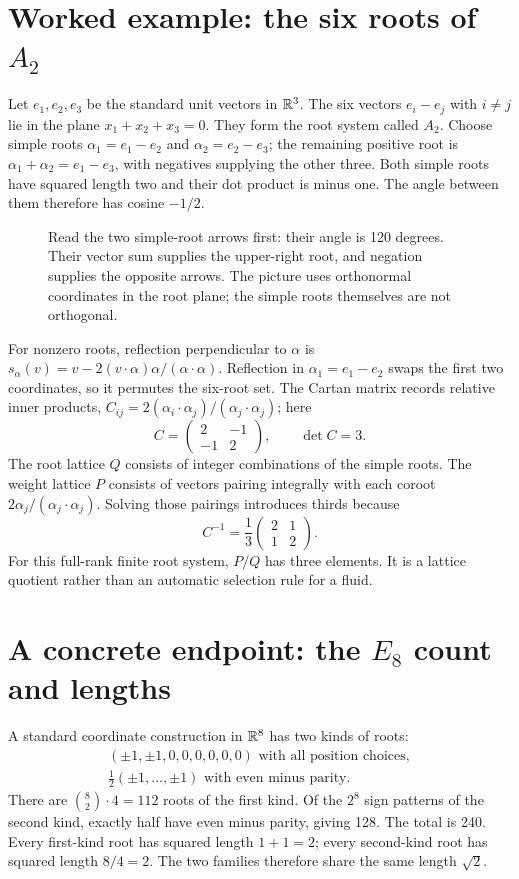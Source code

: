 \section{Worked example: the six roots of \texorpdfstring{$A_2$}{A2}}
Let $e_1,e_2,e_3$ be the standard unit vectors in $\mathbb{R}^3$. The six vectors
$e_i-e_j$ with $i\ne j$ lie in the plane $x_1+x_2+x_3=0$.
They form the root system called $A_2$. Choose simple roots
$\alpha_1=e_1-e_2$ and $\alpha_2=e_2-e_3$; the remaining positive root
is $\alpha_1+\alpha_2=e_1-e_3$, with negatives supplying the other three.
Both simple roots have squared length two and their dot product is minus one.
The angle between them therefore has cosine $-1/2$.

\begin{figure}[htbp]
  \centering
  
  \caption{Read the two simple-root arrows first: their angle is 120 degrees. Their vector sum supplies the upper-right root, and negation supplies the opposite arrows. The picture uses orthonormal coordinates in the root plane; the simple roots themselves are not orthogonal.}
  \label{fig:learn:root_hexagon}
\end{figure}

For nonzero roots, reflection perpendicular to $\alpha$ is
$s_\alpha(v)=v-2(v\cdot\alpha)\alpha/(\alpha\cdot\alpha)$.
Reflection in $\alpha_1=e_1-e_2$ swaps the first two coordinates, so it
permutes the six-root set. The Cartan matrix records relative inner products,
$C_{ij}=2(\alpha_i\cdot\alpha_j)/(\alpha_j\cdot\alpha_j)$; here
\[
 C=\begin{pmatrix}2&-1\\-1&2\end{pmatrix},\qquad\det C=3.
\]
The root lattice $Q$ consists of integer combinations of the simple roots.
The weight lattice $P$ consists of vectors pairing integrally with each
coroot $2\alpha_j/(\alpha_j\cdot\alpha_j)$. Solving those pairings
introduces thirds because
\[
 C^{-1}=\frac13\begin{pmatrix}2&1\\1&2\end{pmatrix}.
\]
For this full-rank finite root system, $P/Q$ has three elements. It is a
lattice quotient rather than an automatic selection rule for a fluid.

\section{A concrete endpoint: the \texorpdfstring{$E_8$}{E8} count and lengths}
A standard coordinate construction in $\mathbb{R}^8$ has two kinds of roots:
\[
 \begin{gathered}
 (\pm1,\pm1,0,0,0,0,0,0)\text{ with all position choices},\\
 \tfrac12(\pm1,\ldots,\pm1)\text{ with even minus parity}.
 \end{gathered}
\]
There are $\binom82\cdot4=112$ roots of the first kind. Of the $2^8$
sign patterns of the second kind, exactly half have even minus parity,
giving 128. The total is 240. Every first-kind root has squared length
$1+1=2$; every second-kind root has squared length $8/4=2$.
The two families therefore share the same length $\sqrt2$.

